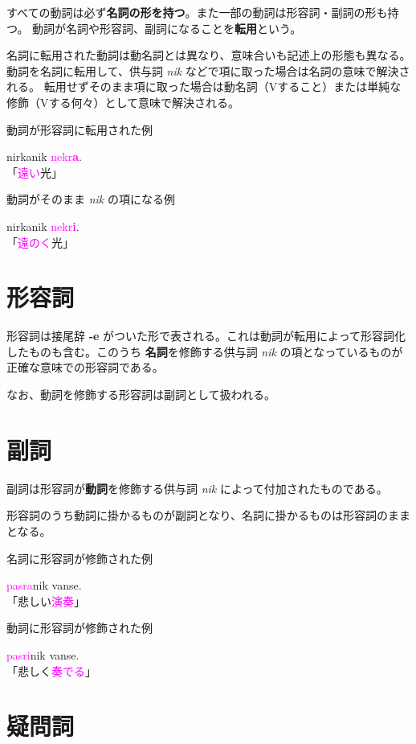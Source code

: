 すべての動詞は必ず\textbf{名詞の形を持つ}。また一部の動詞は形容詞・副詞の形も持つ。
動詞が名詞や形容詞、副詞になることを\textbf{転用}という。

名詞に転用された動詞は動名詞とは異なり、意味合いも記述上の形態も異なる。
動詞を名詞に転用して、供与詞 \emph{nik} などで項に取った場合は名詞の意味で解決される。
転用せずそのまま項に取った場合は動名詞（Vすること）または単純な修飾（Vする何々）として意味で解決される。

\begin{itembox}[l]{動詞が形容詞に転用された例}
    \begin{pindent}
        \noindent
        nirkanik \textcolor{magenta}{nekr\textbf{a}}. \\
        「\textcolor{magenta}{遠い}光」
    \end{pindent}
\end{itembox}

\begin{itembox}[l]{動詞がそのまま \emph{nik} の項になる例}
    \begin{pindent}
        nirkanik \textcolor{magenta}{nekr\textbf{i}}. \\
        「\textcolor{magenta}{遠のく}光」
        \noindent
    \end{pindent}
\end{itembox}

\section{形容詞}

形容詞は接尾辞 \textbf{-e} がついた形で表される。これは動詞が転用によって形容詞化したものも含む。このうち \textbf{名詞}を修飾する供与詞 \emph{nik} の項となっているものが正確な意味での形容詞である。

なお、動詞を修飾する形容詞は副詞として扱われる。

\section{副詞}

副詞は形容詞が\textbf{動詞}を修飾する供与詞 \emph{nik} によって付加されたものである。

形容詞のうち動詞に掛かるものが副詞となり、名詞に掛かるものは形容詞のままとなる。

\begin{itembox}[l]{名詞に形容詞が修飾された例}
    \begin{pindent}
        \noindent
        \textcolor{magenta}{pasra}nik vanse. \\
        「悲しい\textcolor{magenta}{演奏}」
    \end{pindent}
\end{itembox}

\begin{itembox}[l]{動詞に形容詞が修飾された例}
    \begin{pindent}
        \noindent
        \textcolor{magenta}{pasri}nik vanse. \\
        「悲しく\textcolor{magenta}{奏でる}」
    \end{pindent}
\end{itembox}

\section{疑問詞}

